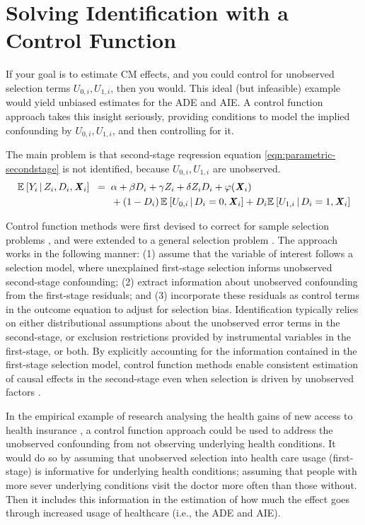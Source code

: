 \section{Solving Identification with a Control Function}
\label{sec:selectionmodel}
If your goal is to estimate CM effects, and you could control for unobserved selection terms $U_{0,i}, U_{1,i}$, then you would.
This ideal (but infeasible) example would yield unbiased estimates for the ADE and AIE.
A control function approach takes this insight seriously, providing conditions to model the implied confounding by $U_{0,i}, U_{1,i}$, and then controlling for it.

The main problem is that second-stage reqression equation \eqref{eqn:parametric-secondstage} is not identified, because $U_{0,i},U_{1,i}$ are unobserved.
\begin{align*}
    \mathbb{E}_{} \left[ Y_i \, \middle\vert \, Z_i, D_i, \boldsymbol{\mathit{X}}_i \right] \;\; =& \;\;
        \alpha
        + \beta D_i
        + \gamma Z_i
        + \delta Z_i D_i
        + \varphi(\boldsymbol{\mathit{X}}_i) \\
        & \;\; +\left( 1 - D_i \right) \mathbb{E}_{} \left[  U_{0,i}  \, \middle\vert \, D_i = 0, \boldsymbol{\mathit{X}}_i \right]
            + D_i \mathbb{E}_{} \left[  U_{1,i}  \, \middle\vert \, D_i = 1, \boldsymbol{\mathit{X}}_i \right]
\end{align*}

Control function methods were first devised to correct for sample selection problems \citep{heckman1974shadow}, and were extended to a general selection problem \citep{heckman1979sample}.
The approach works in the following manner: (1) assume that the variable of interest follows a selection model, where unexplained first-stage selection informs unobserved second-stage confounding; (2) extract information about unobserved confounding from the first-stage residuals; and (3) incorporate these residuals as control terms in the outcome equation to adjust for selection bias.
Identification typically relies on either distributional assumptions about the unobserved error terms in the second-stage, or exclusion restrictions provided by instrumental variables in the first-stage, or both.
By explicitly accounting for the information contained in the first-stage selection model, control function methods enable consistent estimation of causal effects in the second-stage even when selection is driven by unobserved factors \citep{florens2008identification}.

In the empirical example of research analysing the health gains of new access to health insurance \citep{finkelstein2008oregon}, a control function approach could be used to address the unobserved confounding from not observing underlying health conditions.
It would do so by assuming that unobserved selection into health care usage (first-stage) is informative for underlying health conditions; assuming that people with more sever underlying conditions visit the doctor more often than those without.
Then it includes this information in the estimation of how much the effect goes through increased usage of healthcare (i.e., the ADE and AIE).

